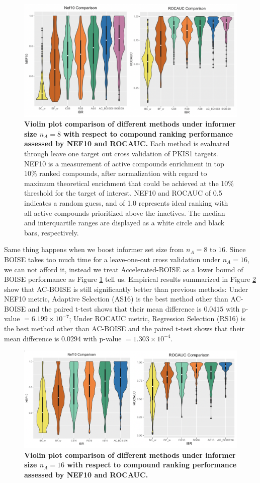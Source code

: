 \documentclass[12pt]{article}
\begin{document}
\begin{figure}[!ht]
\caption{\label{fig:pkis8} 
{\bf Violin plot comparison of different methods under informer size $n_A =8$ with respect to compound ranking performance assessed by NEF10 and ROCAUC.} Each method is evaluated through leave one target out cross validation of PKIS1 targets. NEF10 is a measurement of active compounds enrichment in top $10\%$ ranked compounds, after normalization with regard to maximum theoretical enrichment that could be achieved at the 10\% threshold for the target of interest. NEF10 and ROCAUC of 0.5 indicates a random guess, and of 1.0 represents ideal ranking with all active compounds prioritized above the inactives. The median and interquartile ranges are displayed as a white circle and black bars, respectively.}
\centering
\includegraphics[width=5.0in]{PKIS1_8_eval.png}
\end{figure}

Same thing happens when we boost informer set size from $n_A = 8$ to $16$. Since BOISE takes too much time for a leave-one-out cross validation under $n_A=16$, we can not afford it, instead we treat Accelerated-BOISE as a lower bound of BOISE performance as Figure \ref{fig:pkis8} tell us. Empirical results summarized in Figure \ref{fig:pkis16} show that AC-BOISE is still significantly better than previous methods: Under NEF10 metric, Adaptive Selection (AS16) is the best method other than AC-BOISE and the paired t-test shows that their mean difference is $0.0415$ with p-value $=6.199\times 10^{-7}$;  Under ROCAUC metric, Regression Selection (RS16) is the best method other than AC-BOISE and the paired t-test shows that their mean difference is $0.0294$ with p-value $=1.303\times 10^{-4}$. 
\begin{figure}[!ht]
\caption{\label{fig:pkis16} 
{\bf Violin plot comparison of different methods under informer size $n_A =16$ with respect to compound ranking performance assessed by NEF10 and ROCAUC.}} 
\centering
\includegraphics[width=5.0in]{PKIS1_16_eval.png}
\end{figure}
\end{document}
